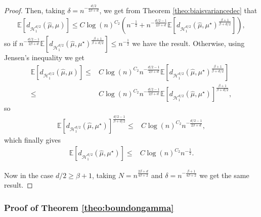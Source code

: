 \documentclass[10pt]{article}
\begin{document}
\begin{proof}
Then, taking $\delta=n^{-\frac{d/2}{2\beta+d}}$, we get from Theorem \ref{theo:biaisvariancedec} that
\begin{align*}
    \mathbb{E}[d_{\mathcal{H}^{d/2}_1}(\hat{\mu},\mu)]\leq C\log(n)^{C_2}\left(n^{-\frac{1}{2}}+   n^{-\frac{d/2-1}{2\beta+d}}\mathbb{E}[d_{\mathcal{H}^{d/2}_1}(\hat{\mu},\mu^\star)^{\frac{\beta+1}{\beta+d/2}}]\right),
\end{align*}
so if $ n^{-\frac{d/2-1}{2\beta+d}}\mathbb{E}[d_{\mathcal{H}^{d/2}_1}(\hat{\mu},\mu^\star)^{\frac{\beta+1}{\beta+d/2}}]\leq n^{-\frac{1}{2}}$ we have the result. Otherwise, using Jensen's inequality we get
\begin{align*}
    \mathbb{E}[d_{\mathcal{H}^{d/2}_1}(\hat{\mu},\mu)]\leq& C\log(n)^{C_2} n^{-\frac{d/2-1}{2\beta+d}}\mathbb{E}[d_{\mathcal{H}^{d/2}_1}(\hat{\mu},\mu^\star)^{\frac{\beta+1}{\beta+d/2}}]\\
    \leq& C\log(n)^{C_2} n^{-\frac{d/2-1}{2\beta+d}}\mathbb{E}[d_{\mathcal{H}^{d/2}_1}(\hat{\mu},\mu^\star)]^{\frac{\beta+1}{\beta+d/2}},
\end{align*}
so
\begin{align*}
    \mathbb{E}[d_{\mathcal{H}^{d/2}_1}(\hat{\mu},\mu^\star)]^{\frac{d/2-1}{\beta+d/2}}\leq& C\log(n)^{C_2} n^{-\frac{d/2-1}{2\beta+d}},
\end{align*}
which finally gives 
\begin{align*}
    \mathbb{E}[d_{\mathcal{H}^{d/2}_1}(\hat{\mu},\mu^\star)]\leq& C\log(n)^{C_2} n^{-\frac{1}{2}}.
\end{align*}


Now in the case $d/2 \geq \beta+1$, taking $N=n^{\frac{2\beta+d}{4\beta+2}}$ and $\delta=n^{-\frac{\beta+1}{4\beta+2}}$ we get the same result.

\end{proof}

\subsubsection{Proof of Theorem \ref{theo:boundongamma}}\label{sec:theo:boundongamma}
\end{document}
